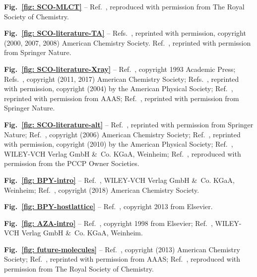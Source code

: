 \bigskip \noindent
\textbf{Fig.~\ref{fig: SCO-MLCT}} --
Ref.~\cite{Domingo2014}, reproduced with permission from The Royal Society of Chemistry.

\bigskip \noindent
\textbf{Fig.~\ref{fig: SCO-literature-TA}} --
Refs.~\cite{Monat2000, Gawelda2007a, Smeigh2008},
reprinted with permission, copyright (2000, 2007, 2008) American Chemistry Society.
Ref.~\cite{Aubock2015}, reprinted with permission from Springer Nature.

\bigskip \noindent
\textbf{Fig.~\ref{fig: SCO-literature-Xray}} --
Ref.~\cite{Henke1993}, copyright \textsuperscript{\textcopyright{}} 1993 Academic Press;
Refs.~\cite{Huse2011, March2017}, copyright (2011, 2017) American Chemistry Society;
Refs.~\cite{Rehr2000, Gawelda2007b},
reprinted with permission, copyright (2004) by the American Physical Society;
Ref.~\cite{Bressler2009}, reprinted with permission from AAAS;
Ref.~\cite{Zhang2014}, reprinted with permission from Springer Nature.

\bigskip \noindent
\textbf{Fig.~\ref{fig: SCO-literature-alt}} --
Ref.~\cite{Zhang2014}, reprinted with permission from Springer Nature;
Ref.~\cite{Tarnovsky2006}, copyright (2006) American Chemistry Society;
Ref.~\cite{Chang2010},
reprinted with permission, copyright (2010) by the American Physical Society;
Ref.~\cite{Sousa2013},
\textsuperscript{\textcopyright{}} WILEY-VCH Verlag GmbH \&~Co. KGaA, Weinheim;
Ref.~\cite{Sousa2018b}, reproduced with permission from the PCCP Owner Societies.

\bigskip \noindent
\textbf{Fig.~\ref{fig: BPY-intro}} --
Ref.~\cite{Sousa2013},
\textsuperscript{\textcopyright{}} WILEY-VCH Verlag GmbH \&~Co. KGaA, Weinheim;
Ref.~\cite{Zhang2018}, copyright (2018) American Chemistry Society.

\bigskip \noindent
\textbf{Fig.~\ref{fig: BPY-hostlattice}} --
Ref.~\cite{Sousa2013}, copyright \textsuperscript{\textcopyright{}} 2013 from Elsevier.

\bigskip \noindent
\textbf{Fig.~\ref{fig: AZA-intro}} --
Ref.~\cite{Ksenofontov1998},
copyright \textsuperscript{\textcopyright{}} 1998 from Elsevier;
Ref.~\cite{Capes2000}, \textsuperscript{\textcopyright{}} WILEY-VCH Verlag GmbH \&~Co. KGaA, Weinheim.

\bigskip \noindent
\textbf{Fig.~\ref{fig: future-molecules}} --
Ref.~\cite{Milek2013}, copyright (2013) American Chemistry Society;
Ref.~\cite{Venkataramani2011}, reprinted with permission from AAAS;
Ref.~\cite{Nihei2011}, reproduced with permission from The Royal Society of Chemistry.





